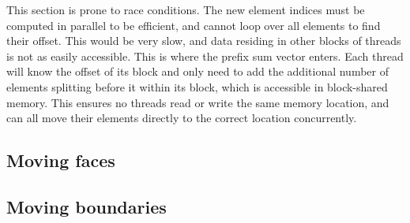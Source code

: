 This section is prone to race conditions. The new element indices must be computed in parallel to be
efficient, and cannot loop over all elements to find their offset. This would be very slow, and data
residing in other blocks of threads is not as easily accessible. This is where the prefix sum vector
enters. Each thread will know the offset of its block and only need to add the additional number of
elements splitting before it within its block, which is accessible in block-shared memory. This
ensures no threads read or write the same memory location, and can all move their elements directly
to the correct location concurrently.

\subsection{Moving faces} \label{subsection:adaptive_mesh_refinement:implementation:moving_faces}


\subsection{Moving boundaries}
\label{subsection:adaptive_mesh_refinement:implementation:moving_boundaries}

